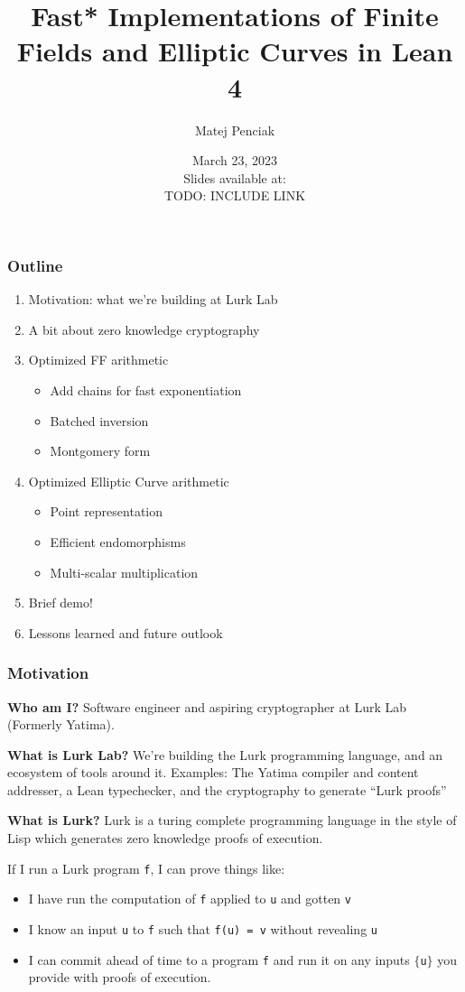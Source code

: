 \documentclass[options]{beamer}
\title{Fast* Implementations of Finite Fields and Elliptic Curves in Lean 4}
\author{Matej Penciak}
\institute{Lurk Lab}
\date{March 23, 2023 \\ Slides available at: \\ TODO: INCLUDE LINK}
\begin{document}
\frame{\titlepage}

\begin{frame}
    \frametitle{Outline}
    \begin{enumerate}
        \item Motivation: what we're building at Lurk Lab
        \item A bit about zero knowledge cryptography
        \item Optimized FF arithmetic
        \begin{itemize}
            \item Add chains for fast exponentiation
            \item Batched inversion
            \item Montgomery form
        \end{itemize}
        \item Optimized Elliptic Curve arithmetic
        \begin{itemize}
            \item Point representation
            \item Efficient endomorphisms
            \item Multi-scalar multiplication
        \end{itemize}
        \item Brief demo!
        \item Lessons learned and future outlook
    \end{enumerate}
\end{frame}

\begin{frame}[fragile]
    \frametitle{Motivation}
    {\bf Who am I?} Software engineer and aspiring cryptographer at Lurk Lab (Formerly Yatima).

    \vspace{5pt}

    {\bf What is Lurk Lab?} We're building the Lurk programming language, and an ecosystem of tools around it.
    Examples: The Yatima compiler and content addresser, a Lean typechecker, and the cryptography to generate ``Lurk proofs''

    \vspace{5pt}

    {\bf What is Lurk?} Lurk is a turing complete programming language in the style of Lisp which generates zero knowledge proofs of execution.


    If I run a Lurk program \verb+f+, I can prove things like:
    \begin{itemize}
        \item I have run the computation of \verb+f+ applied to \verb+u+ and gotten \verb+v+
        \item I know an input \verb+u+ to \verb+f+ such that \verb+f(u) = v+ without revealing \verb+u+
        \item I can commit ahead of time to a program \verb+f+ and run it on any inputs $\{$\verb+u+$\}$ you provide with proofs of execution.
    \end{itemize}

\end{frame}
\end{document}
